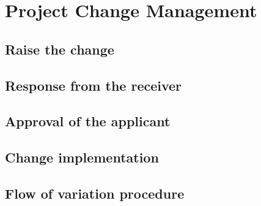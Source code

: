\chapter{Project Change Management}

\section{Raise the change}

\section{Response from the receiver}

\section{Approval of the applicant}

\section{Change implementation}

\section{Flow of variation procedure}
